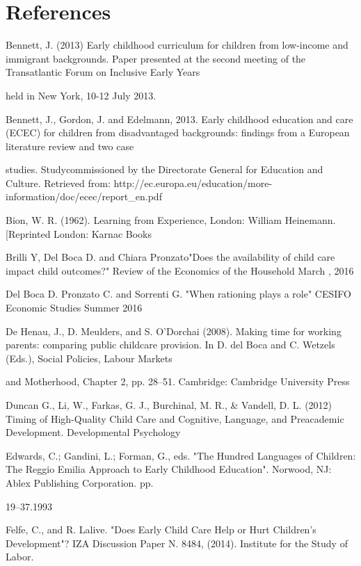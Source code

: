\documentclass[12pt]{article}
\begin{document}
\bigskip 

%

\section{References}

Bennett, J. (2013) Early childhood curriculum for children from low-income
and immigrant backgrounds. Paper presented at the second meeting of the
Transatlantic Forum on Inclusive Early Years

held in New York, 10-12 July 2013.

Bennett, J., Gordon, J. and Edelmann, 2013. Early childhood education and
care (ECEC) for children from disadvantaged backgrounds: findings from a
European literature review and two case

studies. Studycommissioned by the Directorate General for Education and
Culture. Retrieved from:
http://ec.europa.eu/education/more-information/doc/ecec/report\_en.pdf

Bion, W. R. (1962). Learning from Experience, London: William Heinemann.
[Reprinted London: Karnac Books

Brilli Y, Del Boca D. and Chiara Pronzato"Does the availability of child
care impact child outcomes?" Review of the Economics of the Household March
, 2016

Del Boca D. Pronzato C. and Sorrenti G. "When rationing plays a role" 
CESIFO Economic Studies Summer 2016

De Henau, J., D. Meulders, and S. O'Dorchai (2008). Making time for working
parents: comparing public childcare provision. In D. del Boca and C. Wetzels
(Eds.), Social Policies, Labour Markets

and Motherhood, Chapter 2, pp. 28--51. Cambridge: Cambridge University Press

Duncan G., Li, W., Farkas, G. J., Burchinal, M. R., \& Vandell, D. L. (2012)
Timing of High-Quality Child Care and Cognitive, Language, and Preacademic
Development. Developmental Psychology

Edwards, C.; Gandini, L.; Forman, G., eds. "The Hundred Languages of
Children: The Reggio Emilia Approach to Early Childhood Education". Norwood,
NJ: Ablex Publishing Corporation. pp.

19--37.1993

Felfe, C., and R. Lalive. "Does Early Child Care Help or Hurt Children's
Development"? IZA Discussion Paper N. 8484, (2014). Institute for the Study
of Labor.
\end{document}
